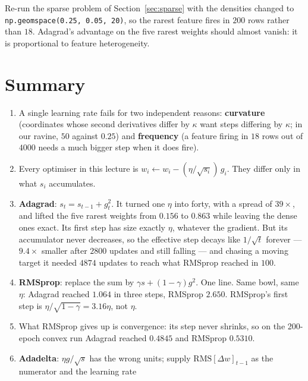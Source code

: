 \documentclass[11pt]{article}
\begin{document}
\begin{tryit}
Re-run the sparse problem of Section~\ref{sec:sparse} with the densities
changed to \texttt{np.geomspace(0.25, 0.05, 20)}, so the rarest feature fires
in $200$ rows rather than $18$. Adagrad's advantage on the five rarest weights
should almost vanish: it is proportional to feature heterogeneity.
\end{tryit}

\newpage
\section{Summary}

\begin{enumerate}[leftmargin=*]
  \item A single learning rate fails for two independent reasons:
    \textbf{curvature} (coordinates whose second derivatives differ by $\kappa$
    want steps differing by $\kappa$; in our ravine, $50$ against $0.25$) and
    \textbf{frequency} (a feature firing in $18$ rows out of $4000$ needs a much
    bigger step when it does fire).
  \item Every optimiser in this lecture is
    $w_i \leftarrow w_i - (\eta/\sqrt{s_i})\,g_i$. They differ only in what
    $s_i$ accumulates.
  \item \textbf{Adagrad}: $s_t = s_{t-1} + g_t^2$. It turned one $\eta$ into
    forty, with a spread of $39\times$, and lifted the five rarest weights from
    $0.156$ to $0.863$ while leaving the dense ones exact. Its first step has
    size exactly $\eta$, whatever the gradient. But its accumulator never
    decreases, so the effective step decays like $1/\sqrt{t}$ forever ---
    $9.4\times$ smaller after $2800$ updates and still falling --- and chasing
    a moving target it needed $4874$ updates to reach what RMSprop reached in
    $100$.
  \item \textbf{RMSprop}: replace the sum by $\gamma s + (1-\gamma)g^2$. One
    line. Same bowl, same $\eta$: Adagrad reached $1.064$ in three steps,
    RMSprop $2.650$. RMSprop's first step is $\eta/\sqrt{1-\gamma} = 3.16\eta$,
    not $\eta$.
  \item What RMSprop gives up is convergence: its step never shrinks, so on the
    200-epoch convex run Adagrad reached $0.4845$ and RMSprop $0.5310$.
  \item \textbf{Adadelta}: $\eta g/\sqrt{s}$ has the wrong units; supply
    $\mathrm{RMS}[\Delta w]_{t-1}$ as the numerator and the learning rate

\end{enumerate}
\end{document}
